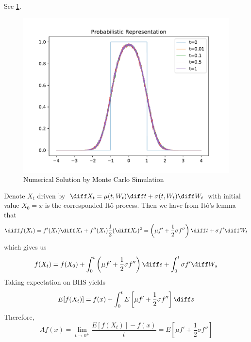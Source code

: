 \begin{subproblem}
        \item
        See \cref{fig:prob sol}.
        \begin{figure}[h]
            \centering
            \includegraphics[width=\textwidth]{prob-sol}
            \caption{Numerical Solution by Monte Carlo Simulation}
            \label{fig:prob sol}
        \end{figure}
    \end{subproblem}

    \problem
    Denote $X_t$ driven by $\diff X_t=\mu(t,W_t)\diff t+\sigma(t,W_t)\diff W_t$
    with initial value $X_0=x$
    is the corresponded It\^o process. Then we have from It\^o's lemma
    that
    \[\diff f(X_t)=f'(X_t)\diff X_t+f''(X_t)\frac{1}{2}(\diff X_t)^2
    =\left(\mu f'+\frac{1}{2}\sigma f''\right)\diff t+\sigma f'\diff W_t\]
    which gives us
    \[f(X_t)=f(X_0)+\int_0^t\left(\mu f'+\frac{1}{2}\sigma f''\right)\diff s
    +\int_0^t\sigma f'\diff W_s\]
    Taking expectation on BHS yields
    \[E[f(X_t)]=f(x)+\int_0^tE\left[\mu f'+\frac{1}{2}\sigma f''\right]\diff s\]
    Therefore,
    \[Af(x)=\lim_{t\to 0^+}\frac{E[f(X_t)]-f(x)}{t}
    =E\left[\mu f'+\frac{1}{2}\sigma f''\right]\]

    \problem

